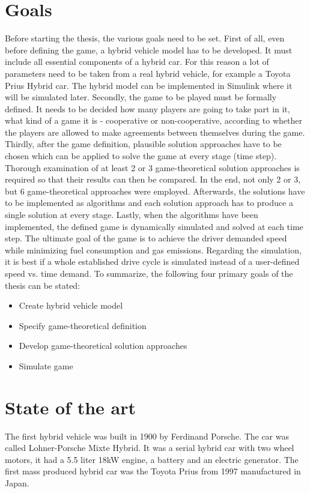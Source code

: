 \section{Goals}
Before starting the thesis, the various goals need to be set. First of all, even before defining the game, a hybrid vehicle model has to be developed. It must include all essential components of a hybrid car. For this reason a lot of parameters need to be taken from a real hybrid vehicle, for example a Toyota Prius Hybrid car. The hybrid model can be implemented in Simulink where it will be simulated later. Secondly, the game to be played must be formally defined. It needs to be decided how many players are going to take part in it, what kind of a game it is - cooperative or non-cooperative, according to whether the players are allowed to make agreements between themselves during the game. Thirdly, after the game definition, plausible solution approaches have to be chosen which can be applied to solve the game at every stage (time step). Thorough examination of at least 2 or 3 game-theoretical solution approaches is required so that their results can then be compared. In the end, not only 2 or 3, but 6 game-theoretical approaches were employed.  Afterwards, the solutions have to be implemented as algorithms and each solution approach has to produce a single solution at every stage. Lastly, when the algorithms have been implemented, the defined game is dynamically simulated and solved at each time step. The ultimate goal of the game is to achieve the driver demanded speed while minimizing fuel consumption and gas emissions. Regarding the simulation, it is best if a whole established drive cycle is simulated instead of a user-defined speed vs. time demand. To summarize, the following four primary goals of the thesis can be stated:

\begin{itemize}
\item Create hybrid vehicle model
\item Specify game-theoretical definition
\item Develop game-theoretical solution approaches
\item Simulate game
\end{itemize}

\section{State of the art} 
The first hybrid vehicle was built in 1900 by Ferdinand Porsche. The car was called Lohner-Porsche Mixte Hybrid. It was a serial hybrid car with two wheel motors, it had a 5.5 liter 18kW engine, a battery and an electric generator. The first mass produced hybrid car was the Toyota Prius from 1997 manufactured in Japan.

